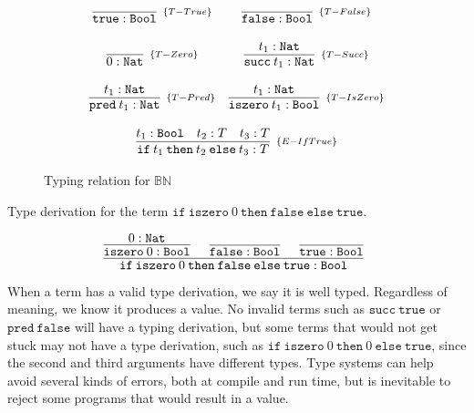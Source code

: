 \begin{figure*}[!h]
    \[
        \begin{array}{cc}
            \infer[_{\{T-True\}}]{\texttt{true} : \texttt{Bool}}{}
            &
            \infer[_{\{T-False\}}]{\texttt{false} : \texttt{Bool}}{}
            \\ \\
            \infer[_{\{T-Zero\}}]{0 : \texttt{Nat}}{}
            &
            \infer[_{\{T-Succ\}}]{\texttt{succ}\:t_1 : \texttt{Nat}}{t_1 : \texttt{Nat}}
            \\ \\
            \infer[_{\{T-Pred\}}]{\texttt{pred}\:t_1 : \texttt{Nat}}{t_1 : \texttt{Nat}}
            &
            \infer[_{\{T-IsZero\}}]{\texttt{iszero}\:t_1 : \texttt{Bool}}{t_1 : \texttt{Nat}}
            \\ \\
            \multicolumn{2}{c}{
                \infer[_{\{E-IfTrue\}}]{
                    \texttt{if}\:t_1\:\texttt{then}\:t_2\:\texttt{else}\:t_3 : T
                }{
                    t_1 : \texttt{Bool} & t_2 : T & t_3 : T
                }
            }
        \end{array}
    \]
    \centering
    \caption{Typing relation for \(\mathbb{B}\mathbb{N}\)}
    \label{fig:bn-typing-relation}
\end{figure*}

\begin{example}
    Type derivation for the term \(\texttt{if}\:\texttt{iszero}\:0\:\texttt{then}\:\texttt{false}\:\texttt{else}\:\texttt{true}\).

    \[
        \infer[]{
            \texttt{if}\:\texttt{iszero}\:0\:\texttt{then}\:\texttt{false}\:\texttt{else}\:\texttt{true} : \texttt{Bool}
        }{
            \infer[]{
                \texttt{iszero}\:0 : \texttt{Bool}
            }{
                0 : \texttt{Nat}
            }
            &
            \infer[]{\texttt{false} : \texttt{Bool}}{}
            &
            \infer[]{\texttt{true} : \texttt{Bool}}{}
        }
    \]
\end{example}

When a term has a valid type derivation, we say it is well typed. Regardless of
meaning, we know it produces a value. No invalid terms such as \(\texttt{succ}\:
\texttt{true}\) or \(\texttt{pred}\:\texttt{false}\) will have a typing derivation,
but some terms that would not get stuck may not have a type derivation, such as
\(\texttt{if}\:\texttt{iszero}\:0\:\texttt{then}\:0\:\texttt{else}\:\texttt{true}\),
since the second and third arguments have different types. Type systems can help 
avoid several kinds of errors, both at compile and run time, but is inevitable to
reject some programs that would result in a value.

